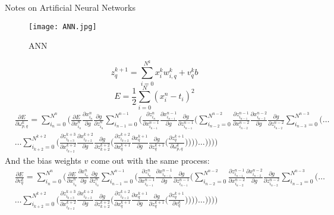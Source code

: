 \documentclass{amsart}
\begin{document}
%
\begin{center}
Notes on Artificial Neural Networks
\end{center}
%
\begin{figure}[h!]
\label{colliding_spheres}
\centering
  \texttt{[image: ANN.jpg]}
\caption{ANN}
\end{figure}
%
\begin{equation*}
z_q^{k+1} = \sum_{i=0}^{N^k} x_i^k w_{i,q}^k + v_q^k b
\end{equation*}
%
\begin{equation*}
E = \frac{1}{2} \sum_{i=0}^N (x_i^n - t_i)^2
\end{equation*}
%
\begin{equation*}
\begin{aligned}
&\frac{\partial E}{\partial \omega_{p,q}^k} = \sum_{i_n = 0}^{N^n} \Bigg( \frac{\partial E}{\partial x_{i_n}^n}
\frac{\partial x_{i_n}^n}{\partial g} \frac{\partial g}{\partial z_{i_n}^n} \sum_{i_{n-1}=0}^{N^{n-1}} \Bigg(
\frac{\partial z_{i_n}^n}{\partial x_{i_{n-1}}^{n-1}} \frac{\partial x_{i_{n-1}}^{n-1}}{\partial g}
\frac{\partial g}{\partial z_{i_{n-1}}^{n-1}} \Bigg( \sum_{i_{n-2}=0}^{N^{n-2}}
\frac{\partial z_{i_{n-1}}^{n-1}}{\partial x_{i_{n-2}}^{n-2}}
\frac{\partial x_{i_{n-2}}^{n-2}}{\partial g} \frac{\partial g}{\partial z_{i_{n-2}}^{n-2}}
\sum_{i_{n-3}=0}^{N^{n-3}} \Bigg( \ldots\\
&\ldots \sum_{i_{k+2}=0}^{N^{k+2}} \Bigg( \frac{\partial z_{i_{k+3}}^{k+3}}{\partial x_{i_{k+2}}^{k+2}}
\frac{\partial x_{i_{k+2}}^{k+2}}{\partial g}
\frac{\partial g}{\partial z_{k+2}^{k+2}} \Bigg( \frac{\partial z_{i_{k+2}}^{k+2}}{\partial x_q^{k+1}}
\frac{\partial x_q^{k+1}}{\partial g}
\frac{\partial g}{\partial z_q^{k+1}} \Bigg(
\frac{\partial z_q^{k+1}}{\partial \omega_{p,q}^k} \Bigg)\Bigg)\Bigg)\Bigg) \ldots \Bigg)\Bigg)\Bigg)\Bigg)
\end{aligned}
\end{equation*}
%
And the bias weights $v$ come out with the same process:
%
\begin{equation*}
\begin{aligned}
&\frac{\partial E}{\partial v_q^k} = \sum_{i_n = 0}^{N^n} \Bigg( \frac{\partial E}{\partial x_{i_n}^n}
\frac{\partial x_{i_n}^n}{\partial g} \frac{\partial g}{\partial z_{i_n}^n} \sum_{i_{n-1}=0}^{N^{n-1}} \Bigg(
\frac{\partial z_{i_n}^n}{\partial x_{i_{n-1}}^{n-1}} \frac{\partial x_{i_{n-1}}^{n-1}}{\partial g}
\frac{\partial g}{\partial z_{i_{n-1}}^{n-1}} \Bigg( \sum_{i_{n-2}=0}^{N^{n-2}}
\frac{\partial z_{i_{n-1}}^{n-1}}{\partial x_{i_{n-2}}^{n-2}}
\frac{\partial x_{i_{n-2}}^{n-2}}{\partial g} \frac{\partial g}{\partial z_{i_{n-2}}^{n-2}}
\sum_{i_{n-3}=0}^{N^{n-3}} \Bigg( \ldots\\
&\ldots \sum_{i_{k+2}=0}^{N^{k+2}} \Bigg( \frac{\partial z_{i_{k+3}}^{k+3}}{\partial x_{i_{k+2}}^{k+2}}
\frac{\partial x_{i_{k+2}}^{k+2}}{\partial g}
\frac{\partial g}{\partial z_{k+2}^{k+2}} \Bigg( \frac{\partial z_{i_{k+2}}^{k+2}}{\partial x_q^{k+1}}
\frac{\partial x_q^{k+1}}{\partial g}
\frac{\partial g}{\partial z_q^{k+1}} \Bigg(
\frac{\partial z_q^{k+1}}{\partial v_q^k} \Bigg)\Bigg)\Bigg)\Bigg) \ldots \Bigg)\Bigg)\Bigg)\Bigg)
\end{aligned}
\end{equation*}
\end{document}
